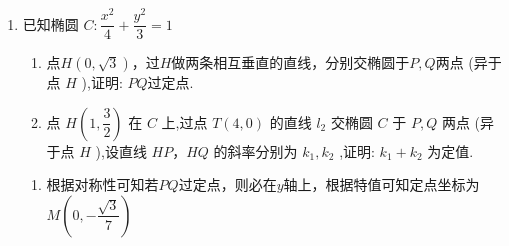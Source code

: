 \begin{enumerate}
\begin{jieda}
\begin{enumerate}
            
            $\vv{AD} \cdot  \vv{EB} = \left( {\vv{AF} + \vv{FD}}\right)  \cdot  \left( {\vv{EF} + \vv{FB}}\right) = \vv{AF} \cdot  \vv{EF} + \vv{AF} \cdot  \vv{FB} + \vv{FD} \cdot  \vv{EF} + \vv{FD} \cdot  \vv{FB} = \left| \vv{AF}\right|  \cdot  \left| \vv{FB}\right|  + \left| \vv{FD}\right|  \cdot  \left| \vv{EF}\right| = \left( {{x}_{1} + 1}\right) \left( {{x}_{2} + 1}\right)  + \left( {{x}_{3} + 1}\right) \left( {{x}_{4} + 1}\right)
            $
            
            由题意知,直线 ${l}_{1}$ 的斜率存在且不为 0,设为 $k$ ,则 ${l}_{1}$ 的方程为 $y = k\left( {x - 1}\right)$ .
            
            由 $\left\{  \begin{array}{l} y = k\left( {x - 1}\right) \\  {y}^{2} = {4x} \end{array}\right.$ ,得 ${k}^{2}{x}^{2} - \left( {2{k}^{2} + 4}\right) x + {k}^{2} = 0$，根据韦达定理有$\left\{\begin{array}{l}
                 {x}_{1} + {x}_{2} = 2 + \dfrac{4}{{k}^{2}}  \\
                 {x}_{1}{x}_{2} = 1
            \end{array}\right.$ 根据两直线垂直可知两直线斜率乘积为$-1$，则可得 $\left\{\begin{array}{l}
                 {x}_{3} + {x}_{4} = 2 + 4k^2  \\
                 {x}_{3}{x}_{4} = 1
            \end{array}\right.$
            
            故$\vv{AD} \cdot  \vv{EB} = 1 + \left( {2 + \dfrac{4}{{k}^{2}}}\right)  + 1 + 1 + \left( {2 + 4{k}^{2}}\right)  + 1 = 8 + 4\left( {{k}^{2} + \dfrac{1}{{k}^{2}}}\right)  \geq  8 + 4 \times  2\sqrt{{k}^{2} \cdot  \dfrac{1}{{k}^{2}}} = {16}
            $
            
            当且仅当 ${k}^{2} = \dfrac{1}{{k}^{2}}$ 即 $k =  \pm  1$ 时, $\vv{AD} \cdot  \vv{EB}$ 取最小值 16.
        \end{enumerate}
    \end{jieda}
    
    \item 已知椭圆 $C : \dfrac{{x}^{2}}{4} + \dfrac{{y}^{2}}{3} = 1$
    \begin{enumerate}
        \item 点$H(0, \sqrt{3})$，过$H$做两条相互垂直的直线，分别交椭圆于$P,Q$两点 (异于点 $H$ ),证明: $PQ$过定点.
        \item 点 $H\left( {1,\dfrac{3}{2}}\right)$ 在 $C$ 上,过点 $T\left( {4,0}\right)$ 的直线 ${l}_{2}$ 交椭圆 $C$ 于 $P,Q$ 两点 (异于点 $H$ ),设直线 ${HP}$，${HQ}$ 的斜率分别为 ${k}_{1},{k}_{2}$ ,证明: ${k}_{1} + {k}_{2}$ 为定值.
    \end{enumerate}
    \begin{jieda}
        \begin{enumerate}
            \item 根据对称性可知若$PQ$过定点，则必在$y$轴上，根据特值可知定点坐标为$M\left(0, -\dfrac{\sqrt{3}}{7}\right)$


\end{enumerate}
\end{jieda}
\end{enumerate}
